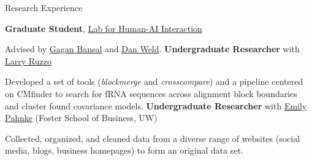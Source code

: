 \begin{rubric}{Research Experience}

	\textbf{Graduate Student}, \href{http://hai.cs.washington.edu}{Lab for Human-AI Interaction}
	\par Advised by \href{https://homes.cs.washington.edu/~bansalg/}{Gagan Bansal} and \href{https://www.cs.washington.edu/people/faculty/weld}{Dan Weld}.
\entry*[2018 -- 2019]%
    \textbf{Undergraduate Researcher} with \href{https://homes.cs.washington.edu/~ruzzo/}{Larry Ruzzo}
    \par Developed a set of tools (\textit{blockmerge} and \textit{crosscompare}) and a pipeline centered on CMfinder to search for fRNA sequences across alignment block boundaries and cluster found covariance models.
\entry*[2018 -- 2019]%
	\textbf{Undergraduate Researcher} with \href{https://faculty.washington.edu/eacox/home/index.html}{Emily Pahnke} (Foster School of Business, UW)
	\par Collected, organized, and cleaned data from a diverse range of websites (social media, blogs, business homepages) to form an original data set.
\end{rubric}